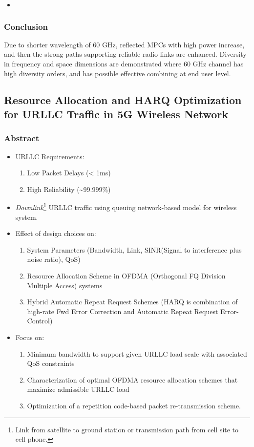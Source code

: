 \documentclass[11pt]{article}
\begin{document}
\begin{enumerate}
\begin{enumerate}
\begin{center}
\end{center}
\begin{itemize}
\item 
\end{itemize}
\end{enumerate}
\end{enumerate}
\subsubsection{Conclusion}
\label{sec:org04c2c5c}
Due to shorter wavelength of 60 GHz, reflected MPCs with high power increase, and then the strong paths supporting reliable radio links are enhanced. Diversity in frequency and space dimensions are demonstrated where 60 GHz channel has high diversity orders, and has possible effective combining at end user level.
\subsection{Resource Allocation and HARQ Optimization for URLLC Traffic in 5G Wireless Network}
\label{sec:orgfd6656e}
\subsubsection{Abstract}
\label{sec:org56d6a6a}
\begin{itemize}
\item URLLC Requirements:
\begin{enumerate}
\item Low Packet Delays (< 1ms)
\item High Reliability (\textasciitilde{}99.999\%)
\end{enumerate}
\item \emph{Downlink}\footnote{Link from satellite to ground station or transmission path from cell site to cell phone.} URLLC traffic using queuing network-based model for wireless system.
\item Effect of design choices on:
\begin{enumerate}
\item System Parameters (Bandwidth, Link, SINR(Signal to interference plus noise ratio), QoS)
\item Resource Allocation Scheme in OFDMA (Orthogonal FQ Division Multiple Access) systems
\item Hybrid Automatic Repeat Request Schemes (HARQ is combination of high-rate Fwd Error Correction and Automatic Repeat Request Error-Control)
\end{enumerate}
\item Focus on:
\begin{enumerate}
\item Minimum bandwidth to support given URLLC load scale with associated QoS constraints
\item Characterization of optimal OFDMA resource allocation schemes that maximize admissible URLLC load
\item Optimization of a repetition code-based packet re-transmission scheme.
\end{enumerate}
\end{itemize}
\end{document}

